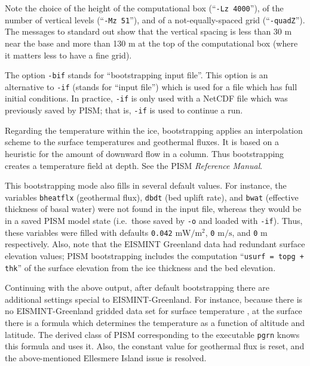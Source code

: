 \documentclass[11pt,final]{amsart}
\begin{document}
Note the choice of the height of the computational box (``\verb|-Lz 4000|''), of the number of vertical levels (``\verb|-Mz 51|''), and of a not-equally-spaced grid (``\verb|-quadZ|'').  The messages to standard out show that the vertical spacing is less than 30 m near the base and more than 130 m at the top of the computational box (where it matters less to have a fine grid).

The option \verb|-bif| stands for ``bootstrapping input file''.  This option is an alternative to \verb|-if| (stands for ``input file'') which is used for a file which has full initial conditions.  In practice, \verb|-if| is only used with a NetCDF file which was previously saved by PISM; that is, \verb|-if| is used to continue a run.

Regarding the temperature within the ice, bootstrapping applies an interpolation scheme to the surface temperatures and geothermal fluxes.  It is based on a heuristic for the amount of downward flow in a column.  Thus bootstrapping creates a temperature field at depth.  See the PISM \emph{Reference Manual}.

This bootstrapping mode also fills in several default values.  For instance, the variables \verb|bheatflx| (geothermal flux), \verb|dbdt| (bed uplift rate), and \verb|bwat| (effective thickness of basal water) were not found in the input file, whereas they would be in a saved PISM model state (i.e.~those saved by \verb|-o| and loaded with \verb|-if|).  Thus, these variables were filled with defaults \verb|0.042| $\text{mW}/\text{m}^2$, \verb|0| $\text{m}/\text{s}$, and \verb|0| m respectively.  Also, note that the EISMINT Greenland data had redundant surface elevation values; PISM bootstrapping includes the computation ``\verb|usurf = topg + thk|'' of the surface elevation from the ice thickness and the bed elevation.

Continuing with the above output, after default bootstrapping there are additional settings special to EISMINT-Greenland.  For instance, because there is no EISMINT-Greenland gridded data set for surface temperature \cite{RitzEISMINT}, at the surface there is a formula which determines the temperature as a function of altitude and latitude.  The derived class of PISM corresponding to the executable \verb|pgrn| knows this formula and uses it.  Also, the constant value for geothermal flux is reset, and the above-mentioned Ellesmere Island issue is resolved.
\end{document}
